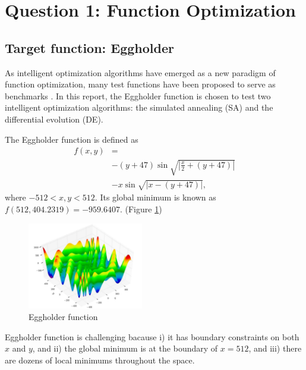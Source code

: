 \documentclass{IEEEtran}
\begin{document}
\section{Question 1: Function Optimization}
{
    \subsection{Target function: Eggholder}
    {
        As intelligent optimization algorithms have emerged as a new paradigm of function optimization, 
        many test functions have been proposed to serve as benchmarks \cite{wiki:Test_functions_for_optimization}.
        In this report, the Eggholder function is chosen to test two intelligent optimization algorithms:
        the simulated annealing (SA) and the differential evolution (DE).

        The Eggholder function is defined as
        \[
            \begin{split}
            f(x,y) &= \\
            &- (y+47) \sin{\sqrt{\left| \frac{x}{2}+(y+47) \right|}} \\
            &- x \sin{\sqrt{\left| x-(y+47) \right|}},
            \end{split}
        \]
        where $-512 < x,y < 512$.
        Its global minimum is known as $f(512, 404.2319) = -959.6407$. (Figure \ref{fig:eggholder})

        \begin{figure}[!htbp]
            \centering
            \includegraphics[width=0.45\textwidth]{figures/eggholder.png}
            \caption{Eggholder function \cite{wiki:Test_functions_for_optimization}}
            \label{fig:eggholder}
        \end{figure}

        Eggholder function is challenging bacause 
        i) it has boundary constraints on both $x$ and $y$, and 
        ii) the global minimum is at the boundary of $x=512$, and 
        iii) there are dozens of local minimums throughout the space.
        
}}
\end{document}
